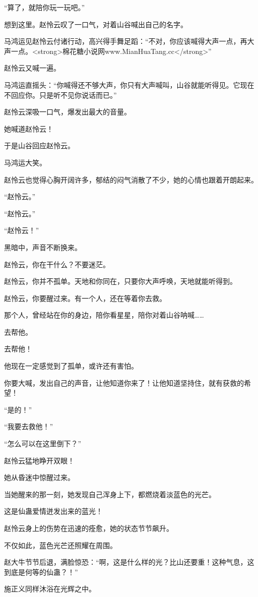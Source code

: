 \begin{this_body}
“算了，就陪你玩一玩吧。”

想到这里。赵怜云叹了一口气，对着山谷喊出自己的名字。

马鸿运见赵怜云付诸行动，高兴得手舞足蹈：“不对，你应该喊得大声一点，再大声一点。<strong>棉花糖小说网www.MianHuaTang.cc</strong>”

赵怜云又喊一遍。

马鸿运直摇头：“你喊得还不够大声，你只有大声喊叫，山谷就能听得见。它现在不回应你。只是听不见你说话而已。”

赵怜云深吸一口气，爆发出最大的音量。

她喊道赵怜云！

于是山谷回应赵怜云。

马鸿运大笑。

赵怜云也觉得心胸开阔许多，郁结的闷气消散了不少，她的心情也跟着开朗起来。

“赵怜云。”

“赵怜云。”

“赵怜云！”

黑暗中，声音不断换来。

赵怜云，你在干什么？不要迷茫。

赵怜云，你并不孤单。天地和你同在，只要你大声呼唤，天地就能听得到。

赵怜云，你要醒过来。有一个人，还在等着你去救。

那个人，曾经站在你的身边，陪你看星星，陪你对着山谷呐喊……

去帮他。

去帮他！

他现在一定感觉到了孤单，或许还有害怕。

你要大喊，发出自己的声音，让他知道你来了！让他知道坚持住，就有获救的希望！

“是的！”

“我要去救他！”

“怎么可以在这里倒下？”

赵怜云猛地睁开双眼！

她从昏迷中惊醒过来。

当她醒来的那一刻，她发现自己浑身上下，都燃烧着淡蓝色的光芒。

这是仙蛊爱情迸发出来的蓝光！

赵怜云身上的伤势在迅速的痊愈，她的状态节节飙升。

不仅如此，蓝色光芒还照耀在周围。

赵大牛节节后退，满脸惊恐：“啊，这是什么样的光？比山还要重！这种气息，这到底是何等的仙蛊？！”

施正义同样沐浴在光辉之中。


\end{this_body}
